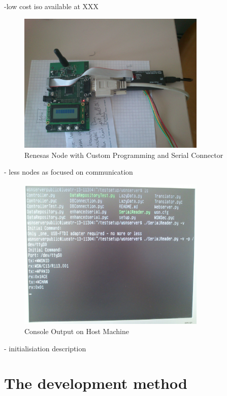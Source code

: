 -low cost iso available at XXX

\begin{figure}[H]
   \centering
   \includegraphics[width=0.8\textwidth]{pic/controller.jpg}%
   \caption{Renesas Node with Custom Programming and Serial Connector}
   \label{nodepic}%
\end{figure}

- less nodes as focused on communication

\begin{figure}[H]
   \centering
   \includegraphics[width=0.8\textwidth]{pic/host_machine.jpg}%
   \caption{Console Output on Host Machine}
   \label{hostpic}%
\end{figure}

- initialisiation description

\newpage
\section{The development method}

